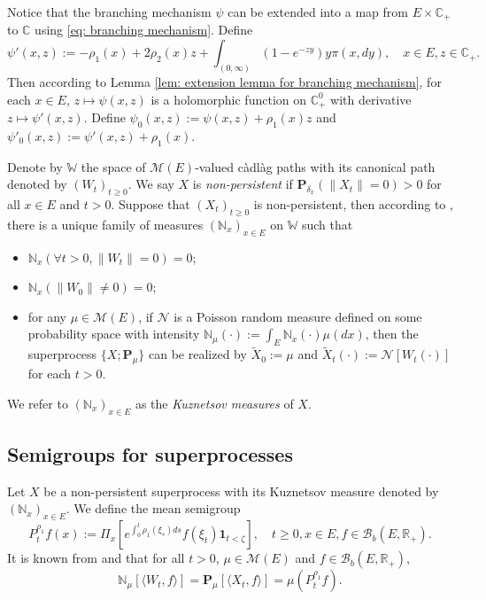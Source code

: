 \documentclass[12pt,a4paper]{amsart}
\theoremstyle{plain}
\theoremstyle{definition}
\numberwithin{equation}{section}
\begin{document}
    Notice that the branching mechanism $\psi$ can be extended into a map from $E \times \mathbb C_+$ to $\mathbb C$ using \eqref{eq: branching mechanism}.
    Define
\begin{equation}
    \psi'(x,z):= - \rho_1(x) + 2\rho_2(x) z + \int_{(0,\infty)} (1-e^{-zy})y\pi(x,dy),
    \quad x\in E, z\in \mathbb C_+.
\end{equation}
    Then according to Lemma \ref{lem: extension lemma for branching mechanism}, for each $x \in E$, $z \mapsto \psi(x,z)$ is a holomorphic function on $\mathbb C_+^0$ with derivative $z \mapsto \psi'(x,z)$.
    Define $\psi_0(x,z) := \psi(x,z)+ \rho_1(x)z $ and $\psi'_0(x,z) := \psi'(x,z) + \rho_1(x)$.

    Denote by $\mathbb W$ the space of $\mathcal M(E)$-valued c\`{a}dl\`{a}g paths with its canonical path denoted by $(W_t)_{t\geq 0}$.
    We say $X$ is \emph{non-persistent} if $\mathbf P_{\delta_x}(\|X_t\|= 0) > 0$ for all $x\in E$ and $t> 0$.
    Suppose that $(X_t)_{t\geq 0}$ is non-persistent, then according to \cite[Section 8.4]{Li2011Measure-valued},
    there is a unique family of measures $(\mathbb N_x)_{x\in E}$ on $\mathbb W$ such that
\begin{itemize}
\item
    $\mathbb N_x (\forall t > 0, \|W_t\|=0) =0$;
\item
    $\mathbb N_x(\|W_0 \|\neq 0) = 0$;
\item
    for any $\mu \in \mathcal M(E)$, 
    if $\mathcal N$ is a Poisson random measure defined on some probability space with intensity $\mathbb N_\mu(\cdot):= \int_E \mathbb N_x(\cdot )\mu(dx)$,
    then the superprocess $\{X;\mathbf P_\mu\}$ can be realized by $\widetilde X_0 := \mu$ and $\widetilde X_t(\cdot) := \mathcal N[W_t(\cdot)]$ for each $t>0$.
\end{itemize}
    We refer to $(\mathbb N_x)_{x\in E}$ as the \emph{Kuznetsov measures} of $X$.
\subsection{{Semigroups for superprocesses}}
\label{sec: definition of vf}
    Let $X$ be a non-persistent superprocess with its Kuznetsov measure denoted by $(\mathbb N_x)_{x\in E}$.
    We define the mean semigroup
\begin{equation}
    P_t^{\rho_1} f(x)
    := \Pi_{x}[e^{\int_0^t \rho_1(\xi_s)ds}f(\xi_t) \mathbf 1_{t< \zeta}],
    \quad t\geq 0, x\in E, f\in \mathcal B_b(E,\mathbb R_+).
\end{equation}
    It is known from \cite[Proposition 2.27]{Li2011Measure-valued} and \cite[Theorem 2.7]{Kyprianou2014Fluctuations} that for all $t > 0$, $\mu \in \mathcal M(E)$ and $f\in \mathcal B_b(E,\mathbb R_+)$,
\begin{equation}
\label{eq: mean formula for superprocesses}
   \mathbb N_{\mu}[\langle W_t, f\rangle]
   =\mathbf P_{\mu}[\langle X_t, f\rangle]
   =\mu(P^{\rho_1}_t f).
\end{equation}
\end{document}
